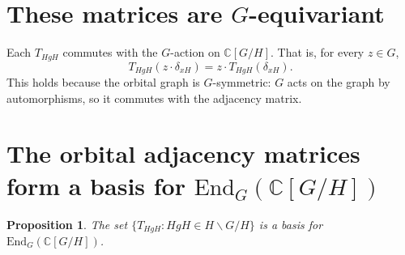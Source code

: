 \documentclass[12pt]{article}
\newtheorem{proposition}[theorem]{Proposition}
\begin{document}
\section{These matrices are $G$-equivariant}

Each $T_{HgH}$ commutes with the $G$-action on $\mathbb{C}[G/H]$. That is, for every $z \in G$,
\[
T_{HgH}(z \cdot \delta_{xH}) = z \cdot T_{HgH}(\delta_{xH}).
\]
This holds because the orbital graph is $G$-symmetric: $G$ acts on the graph by automorphisms, so it commutes with the adjacency matrix.

\section{The orbital adjacency matrices form a basis for $\mathrm{End}_G(\mathbb{C}[G/H])$}

\begin{proposition}
The set $\{T_{HgH} : HgH \in H \backslash G / H\}$ is a basis for $\mathrm{End}_G(\mathbb{C}[G/H])$.
\end{proposition}
\end{document}
